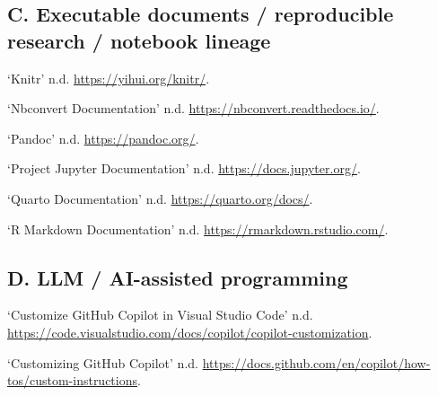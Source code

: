 \documentclass{ZGJournalArticle_2026}
\newlength{\cslhangindent}
\newenvironment{CSLReferences}[2] %
 {\begin{list}{}{%
  \sloppy
  \setlength{\itemindent}{0pt}
  \setlength{\leftmargin}{0pt}
  \setlength{\parsep}{0pt}
  \ifodd #1
   \setlength{\leftmargin}{\cslhangindent}
   \setlength{\itemindent}{-1\cslhangindent}
  \fi
  \setlength{\itemsep}{#2\baselineskip}}}
 {\end{list}}
\begin{document}
\subsection*{C. Executable documents / reproducible research / notebook lineage}
\begin{CSLReferences}{1}{0}
\hypertarget{ref-knitrDocs}{}
{`Knitr'} n.d. \url{https://yihui.org/knitr/}.

\hypertarget{ref-nbconvertDocs}{}

{`Nbconvert Documentation'} n.d.
\url{https://nbconvert.readthedocs.io/}.

\hypertarget{ref-pandocDocs}{}

{`Pandoc'} n.d. \url{https://pandoc.org/}.

\hypertarget{ref-jupyterDocs}{}

{`Project Jupyter Documentation'} n.d. \url{https://docs.jupyter.org/}.

\hypertarget{ref-quartoDocs}{}

{`Quarto Documentation'} n.d. \url{https://quarto.org/docs/}.

\hypertarget{ref-rmarkdownDocs}{}

{`R Markdown Documentation'} n.d. \url{https://rmarkdown.rstudio.com/}.

\end{CSLReferences}

\subsection*{D. LLM / AI-assisted programming}
\begin{CSLReferences}{1}{0}
\hypertarget{ref-vscodeCopilotCustomInstructions}{}
{`Customize GitHub Copilot in Visual Studio Code'} n.d.
\url{https://code.visualstudio.com/docs/copilot/copilot-customization}.

\hypertarget{ref-githubCopilotCustomization}{}

{`Customizing GitHub Copilot'} n.d.
\url{https://docs.github.com/en/copilot/how-tos/custom-instructions}.

\end{CSLReferences}
\end{document}
